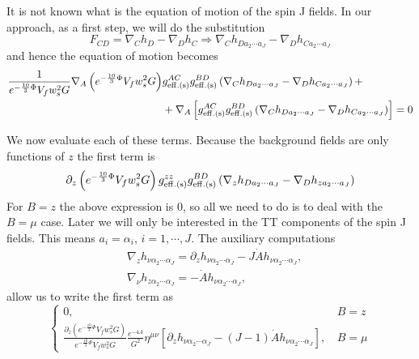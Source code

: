 \documentclass[a4paper,12pt]{article}
\begin{document}
It is not known what is the equation of motion of the spin J fields. In our approach, as a first step, we will do the substitution
\begin{equation}
F_{CD} = \nabla_C h_D - \nabla_D h_C \Rightarrow \nabla_C h_{D a_2 \cdots a_J} - \nabla_D h_{C a_2 \cdots a_J}
\label{eq:spin_j_sub}
\end{equation}
and  hence the equation of motion becomes
\begin{align}
\frac{1}{e^{-\frac{10}{3} \Phi} V_f w_s^2 G}\nabla_A \left(e^{-\frac{10}{3} \Phi} V_f w_s^2 G \right)&g^{AC}_{\rm{eff. (s)}}g^{BD}_{\rm{eff. (s)}}\left(\nabla_C h_{D a_2 \cdots a_J} - \nabla_D h_{C a_2 \cdots a_J}\right) + \notag \\
&+\nabla_A \left[g^{AC}_{\rm{eff. (s)}}g^{BD}_{\rm{eff. (s)}}\left(\nabla_C h_{D a_2 \cdots a_J} - \nabla_D h_{C a_2 \cdots a_J}\right)\right] = 0
\label{eq:spin_J_eom_cov_term}
\end{align}

We now evaluate each of these terms. Because the background fields are only functions of $z$ the first term is
\begin{equation}
\partial_z\left( e^{-\frac{10}{3} \Phi} V_f w_s^2 G \right) g^{zz}_{\rm{eff. (s)}}g^{BD}_{\rm{eff. (s)}}\left(\nabla_z h_{D a_2 \cdots a_J} - \nabla_D h_{z a_2 \cdots a_J}\right)
\label{eq:spin_j_eom_first_term}
\end{equation}
For $B = z$ the above expression is 0, so all we need to do is to deal with the $B=\mu$ case. Later we will only be interested in the TT components of the spin J fields. This means $a_i = \alpha_i, \, i = 1,\cdots, J$.
The auxiliary computations
\begin{align}
& \nabla_z h_{\nu \alpha_2 \cdots \alpha_J} = \partial_z h_{\nu \alpha_2 \cdots \alpha_J} - J \dot{A} h_{\nu \alpha_2 \cdots \alpha_J}, \\
& \nabla_\nu h_{z \alpha_2 \cdots \alpha_J} = - \dot{A} h_{\nu \alpha_2 \cdots \alpha_J},
\label{eq:spin_J_cod_id_1}
\end{align}
allow us to write the first term as
\begin{equation}
\begin{cases}
0, & B = z \\
\frac{\partial_{z}\left( e^{-\frac{10}{3} \Phi} V_f w_s^2 G \right)}{ e^{-\frac{10}{3} \Phi} V_f w_s^2 G} \frac{e^{-4A}}{G^2} \eta^{\mu \nu} \left[ \partial_z h_{\nu \alpha_2 \cdots \alpha_J} - \left(J-1\right) \dot{A} h_{\nu \alpha_2 \cdots \alpha_J} \right], \, &B = \mu
\end{cases}
\end{equation}
\end{document}
